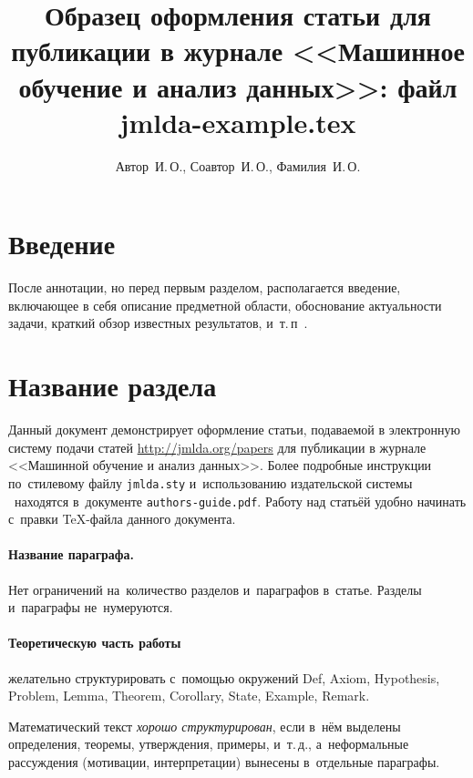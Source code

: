 \documentclass[12pt,twoside]{article}
\title
        [Образец оформления статьи для публикации] %
        {Образец оформления статьи для публикации в журнале <<Машинное обучение и анализ данных>>: файл jmlda-example.tex}
\author
        [Автор~И.\,О.] %
        {Автор~И.\,О., Соавтор~И.\,О., Фамилия~И.\,О.} %
        [Автор~И.\,О.$^1$, Соавтор~И.\,О.$^2$, Фамилия~И.\,О.$^2$] %
\begin{document}
    \maketitle
    \section{Введение}
    После аннотации, но перед первым разделом,
    располагается введение, включающее в себя
    описание предметной области,
    обоснование актуальности задачи,
    краткий обзор известных результатов,
    и~т.\,п~\cite{author09anyscience,myHandbook,author09first-word-of-the-title,voron06latex,author-and-co2007,Lvovsky03}.
    
    \section{Название раздела}
    Данный документ демонстрирует оформление статьи,
    подаваемой в электронную систему подачи статей \url{http://jmlda.org/papers} для публикации в журнале <<Машинной обучение и анализ данных>>.
    Более подробные инструкции по~стилевому файлу \texttt{jmlda.sty}
    и~использованию издательской системы \LaTeXe\
    находятся в~документе \texttt{authors-guide.pdf}.
    Работу над статьёй удобно начинать с~правки \TeX-файла данного документа.
    
    \paragraph{Название параграфа.}
    Нет ограничений на~количество разделов и~параграфов в~статье.
    Разделы и~параграфы не~нумеруются.
    
    \paragraph{Теоретическую часть работы} желательно структурировать
    с~помощью окружений
    Def, Axiom, Hypothesis, Problem, Lemma, Theorem, Corollary, State, Example, Remark.
    
    \begin{Def}
        Математический текст \emph{хорошо структурирован},
        если в~нём выделены определения, теоремы, утверждения, примеры, и~т.\,д.,
        а~неформальные рассуждения (мотивации, интерпретации)
        вынесены в~отдельные параграфы.
    \end{Def}
    
\end{document}

